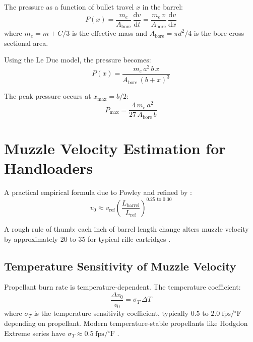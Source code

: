 \documentclass[11pt,twoside,openright]{report}
\newcommand{\dd}{\mathrm{d}}
\newcommand{\degF}{{}^{\circ}\mathrm{F}}
\begin{document}
The pressure as a function of bullet travel $x$ in the barrel:
\begin{equation}
  P(x) = \frac{m_e}{A_{\mathrm{bore}}}\,\frac{\dd v}{\dd t}
  = \frac{m_e\,v}{A_{\mathrm{bore}}}\,\frac{\dd v}{\dd x}
  \label{eq:pressure_travel}
\end{equation}
where $m_e = m + C/3$ is the effective mass and $A_{\mathrm{bore}} = \pi d^2/4$ is the bore cross-sectional area.

Using the Le Duc model, the pressure becomes:
\begin{equation}
  P(x) = \frac{m_e\,a^2\,b\,x}{A_{\mathrm{bore}}\,(b+x)^3}
  \label{eq:pressure_leduc}
\end{equation}

The peak pressure occurs at $x_{\max} = b/2$:
\begin{equation}
  P_{\max} = \frac{4\,m_e\,a^2}{27\,A_{\mathrm{bore}}\,b}
  \label{eq:peak_pressure}
\end{equation}

\section{Muzzle Velocity Estimation for Handloaders}

A practical empirical formula due to Powley and refined by \citet{litz2011applied}:
\begin{equation}
  v_0 \approx v_{\mathrm{ref}}\left(\frac{L_{\mathrm{barrel}}}{L_{\mathrm{ref}}}\right)^{0.25 \text{ to } 0.30}
  \label{eq:barrel_length_correction}
\end{equation}

A rough rule of thumb: each inch of barrel length change alters muzzle velocity by approximately \SI{20}{\fps} to \SI{35}{\fps} for typical rifle cartridges \citep{litz2011applied}.

\subsection{Temperature Sensitivity of Muzzle Velocity}

Propellant burn rate is temperature-dependent. The temperature coefficient:
\begin{equation}
  \frac{\Delta v_0}{v_0} = \sigma_T\,\Delta T
  \label{eq:temp_sensitivity}
\end{equation}
where $\sigma_T$ is the temperature sensitivity coefficient, typically $0.5$ to $2.0\;\text{fps}/\degF$ depending on propellant. Modern temperature-stable propellants like Hodgdon Extreme series have $\sigma_T \approx 0.5\;\text{fps}/\degF$ \citep{litz2011applied}.
\end{document}
